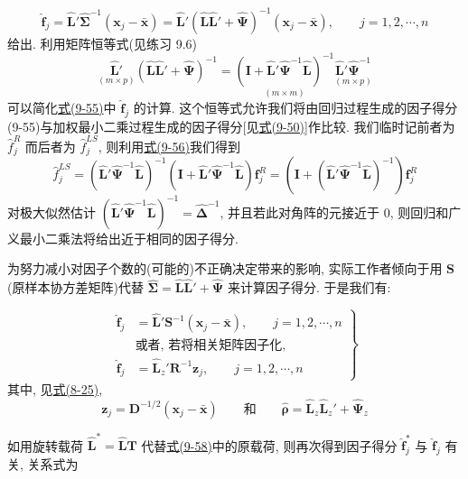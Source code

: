 \label{eq:9-55}
\begin{equation}
\hat{\mathbf{f}}_j=\hat{\mathbf{L}}'\hat{\boldsymbol{\Sigma}}^{-1}(\mathbf{x}_j-\bar{\mathbf{x}})=\hat{\mathbf{L}}'(\hat{\mathbf{L}}\hat{\mathbf{L}}'+\hat{\boldsymbol{\Psi}})^{-1}(\mathbf{x}_j-\bar{\mathbf{x}}), \qquad j=1,2,\cdots,n \tag{9-55}
\end{equation}
给出. 利用矩阵恒等式(见练习 9.6)
\label{eq:9-56}
\begin{equation}
\underset{(m\times p)}{\hat{\mathbf{L}}'}(\hat{\mathbf{L}}\hat{\mathbf{L}}'+\hat{\boldsymbol{\Psi}})^{-1}=\underset{(m\times m)}{(\mathbf{I}+\hat{\mathbf{L}}'\hat{\boldsymbol{\Psi}}^{-1}\hat{\mathbf{L}})^{-1}}\underset{(m\times p)}{\hat{\mathbf{L}}'\hat{\boldsymbol{\Psi}}^{-1}} \tag{9-56}
\end{equation}
可以简化\hyperref[eq:9-55]{式(9-55)}中 $\hat{\mathbf{f}}_j$ 的计算. 这个恒等式允许我们将由回归过程生成的因子得分(9-55)与加权最小二乘过程生成的因子得分[见\hyperref[eq:9-50]{式(9-50)}]作比较. 我们临时记前者为 $\hat{f}_j^{R}$ 而后者为 $\hat{f}_j^{LS}$, 则利用\hyperref[eq:9-56]{式(9-56)}我们得到
\label{eq:9-57}
\begin{equation}
\hat{f}_j^{LS}=(\hat{\mathbf{L}}'\hat{\boldsymbol{\Psi}}^{-1}\hat{\mathbf{L}})^{-1}(\mathbf{I}+\hat{\mathbf{L}}'\hat{\boldsymbol{\Psi}}^{-1}\hat{\mathbf{L}})\mathbf{f}_j^{R}=(\mathbf{I}+(\hat{\mathbf{L}}'\hat{\boldsymbol{\Psi}}^{-1}\hat{\mathbf{L}})^{-1})\mathbf{f}_j^{R} \tag{9-57}
\end{equation}
对极大似然估计 $(\hat{\mathbf{L}}'\hat{\boldsymbol{\Psi}}^{-1}\hat{\mathbf{L}})^{-1}=\hat{\boldsymbol{\Delta}}^{-1}$, 并且若此对角阵的元接近于 0, 则回归和广义最小二乘法将给出近于相同的因子得分.

为努力减小对因子个数的(可能的)不正确决定带来的影响, 实际工作者倾向于用 $\mathbf{S}$(原样本协方差矩阵)代替 $\hat{\boldsymbol{\Sigma}}=\hat{\mathbf{L}}\hat{\mathbf{L}}'+\hat{\boldsymbol{\Psi}}$ 来计算因子得分. 于是我们有:

\begin{mvbox}
{\centering{}\par}
\label{eq:9-58}
\begin{equation}
\left.\begin{aligned}
\hat{\mathbf{f}}_j&=\hat{\mathbf{L}}'\mathbf{S}^{-1}(\mathbf{x}_j-\bar{\mathbf{x}}), \qquad j=1,2,\cdots,n\\
&\text{或者, 若将相关矩阵因子化,}\\
\hat{\mathbf{f}}_j&=\hat{\mathbf{L}}_z'\mathbf{R}^{-1}\mathbf{z}_j, \qquad j=1,2,\cdots,n
\end{aligned}\right\}
\tag{9-58}
\end{equation}
其中, 见\hyperref[eq:8-25]{式(8-25)},
\[
\mathbf{z}_j=\mathbf{D}^{-1/2}(\mathbf{x}_j-\bar{\mathbf{x}})\qquad\text{和}\qquad \hat{\boldsymbol{\rho}}=\hat{\mathbf{L}}_z\hat{\mathbf{L}}_z'+\hat{\boldsymbol{\Psi}}_z
\]
\end{mvbox}

如用旋转载荷 $\hat{\mathbf{L}}^*=\hat{\mathbf{L}}\mathbf{T}$ 代替\hyperref[eq:9-58]{式(9-58)}中的原载荷, 则再次得到因子得分 $\hat{\mathbf{f}}_j^*$ 与 $\hat{\mathbf{f}}_j$ 有关, 关系式为
